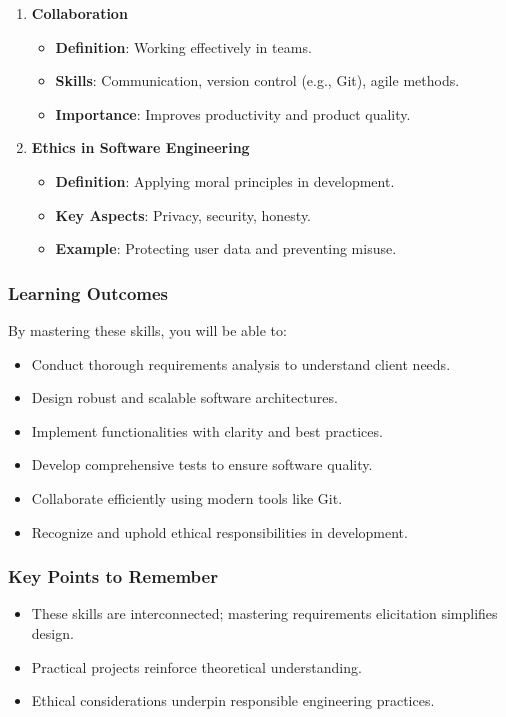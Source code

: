 \documentclass{beamer}
\begin{document}
\begin{frame}[fragile]
\begin{enumerate}
\begin{itemize}
            \item \textbf{Example}: Validating user registration with test cases.
        \end{itemize}
        \item \textbf{Collaboration}
        \begin{itemize}
            \item \textbf{Definition}: Working effectively in teams.
            \item \textbf{Skills}: Communication, version control (e.g., Git), agile methods.
            \item \textbf{Importance}: Improves productivity and product quality.
        \end{itemize}
        \item \textbf{Ethics in Software Engineering}
        \begin{itemize}
            \item \textbf{Definition}: Applying moral principles in development.
            \item \textbf{Key Aspects}: Privacy, security, honesty.
            \item \textbf{Example}: Protecting user data and preventing misuse.
        \end{itemize}
    \end{enumerate}
\end{frame}

\begin{frame}[fragile]
    \frametitle{Learning Outcomes}
    By mastering these skills, you will be able to:
    \begin{itemize}
        \item Conduct thorough requirements analysis to understand client needs.
        \item Design robust and scalable software architectures.
        \item Implement functionalities with clarity and best practices.
        \item Develop comprehensive tests to ensure software quality.
        \item Collaborate efficiently using modern tools like Git.
        \item Recognize and uphold ethical responsibilities in development.
    \end{itemize}
\end{frame}

\begin{frame}[fragile]
    \frametitle{Key Points to Remember}
    \begin{itemize}
        \item These skills are interconnected; mastering requirements elicitation simplifies design.
        \item Practical projects reinforce theoretical understanding.
        \item Ethical considerations underpin responsible engineering practices.
    \end{itemize}
\end{frame}
\end{document}
